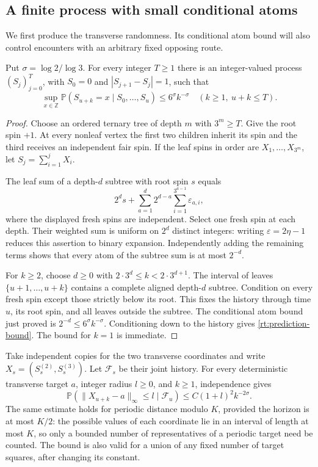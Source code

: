 \subsection{A finite process with small conditional atoms}

We first produce the transverse randomness.  Its conditional atom bound
will also control encounters with an arbitrary fixed opposing route.

\begin{lemma}\label{rt:prediction}
Put \(\sigma=\log2/\log3\).  For every integer \(T\ge1\) there
is an integer-valued process \((S_j)_{j=0}^T\), with \(S_0=0\) and
\(|S_{j+1}-S_j|=1\), such that
\begin{equation}\label{rt:prediction-bound}
 \sup_{x\in\mathbb Z}
 \mathbb P(S_{u+k}=x\mid S_0,\ldots,S_u)
 \le 6^\sigma k^{-\sigma}
 \quad(k\ge1,\ u+k\le T).
\end{equation}
\end{lemma}
\begin{proof}
Choose an ordered ternary tree of depth \(m\) with \(3^m\ge T\).
Give the root spin \(+1\).  At every nonleaf vertex the first two
children inherit its spin and the third receives an independent fair
spin.  If the leaf spins in order are \(X_1,\ldots,X_{3^m}\), let
\(S_j=\sum_{i=1}^jX_i\).

The leaf sum of a depth-\(d\) subtree with root spin \(s\) equals
\[
 2^ds+\sum_{a=1}^d2^{d-a}
                 \sum_{i=1}^{3^{a-1}}\varepsilon_{a,i},
\]
where the displayed fresh spins are independent.  Select one fresh spin
at each depth.  Their weighted sum is uniform on \(2^d\) distinct
integers: writing \(\varepsilon=2\eta-1\) reduces this assertion to
binary expansion.  Independently adding the remaining terms shows that
every atom of the subtree sum is at most \(2^{-d}\).

For \(k\ge2\), choose \(d\ge0\) with
\(2\cdot3^d\le k<2\cdot3^{d+1}\).  The interval of leaves
\(\{u+1,\ldots,u+k\}\) contains a complete aligned depth-\(d\)
subtree.  Condition on every fresh spin except those strictly below its
root.  This fixes the history through time \(u\), its root spin, and
all leaves outside the subtree.  The conditional atom bound just proved
is \(2^{-d}\le6^\sigma k^{-\sigma}\).  Conditioning down to the
history gives \eqref{rt:prediction-bound}.  The bound for \(k=1\) is
immediate.
\end{proof}

Take independent copies for the two transverse coordinates and write
\(X_s=(S_s^{(2)},S_s^{(3)})\).  Let \(\mathcal F_s\) be their joint
history.  For every deterministic transverse target \(a\), integer
radius \(l\ge0\), and \(k\ge1\), independence gives
\begin{equation}\label{rt:target-atoms}
 \mathbb P(\|X_{u+k}-a\|_\infty\le l\mid\mathcal F_u)
 \le C(1+l)^2k^{-2\sigma}.
\end{equation}
The same estimate holds for periodic distance modulo \(K\), provided
the horizon is at most \(K/2\): the possible values of each coordinate
lie in an interval of length at most \(K\), so only a bounded number
of representatives of a periodic target need be counted.  The bound
is also valid for a union of any fixed number of target squares, after
changing its constant.

